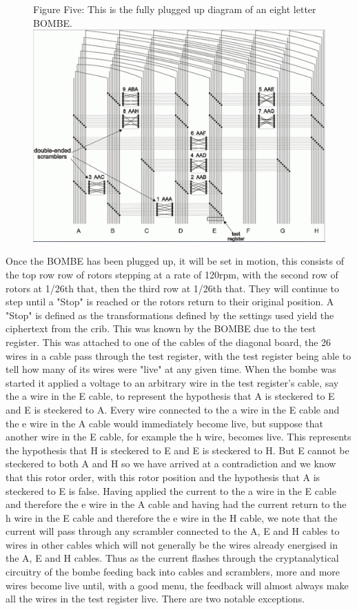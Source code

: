 \documentclass[12pt,a4paper]{article}
\begin{document}
\begin{figure}[h]
\centering
Figure Five: 
This is the fully plugged up diagram of an eight letter BOMBE.
\includegraphics[width=\textwidth]{BOMBEthree.png}
\end{figure}

Once the BOMBE has been plugged up, it will be set in motion, this consists of the top row row of rotors stepping at a rate of 120rpm, with the second row of rotors at 1/26th that, then the third row at 1/26th that. They will continue to step until a "Stop" is reached or the rotors return to their original position. A "Stop" is defined as the transformations defined by the settings used yield the ciphertext from the crib. This was known by the BOMBE due to the test register. This was attached to one of the cables of the diagonal board, the 26 wires in a cable pass through the test register, with the test register being able to tell how many of its wires were "live" at any given time. When the bombe was started it applied a voltage to an arbitrary wire in the test register's cable, say the a wire in the E cable, to represent the hypothesis that A is steckered to E and E is steckered to A. Every wire connected to the a wire in the E cable and the e wire in the A cable would immediately become live, but suppose that another wire in the E cable, for example the h wire, becomes live. This represents the hypothesis that H is steckered to E and E is steckered to H. But E cannot be steckered to both A and H so we have arrived at a contradiction and we know that this rotor order, with this rotor position and the hypothesis that A is steckered to E is false. Having applied the current to the a wire in the E cable and therefore the e wire in the A cable and having had the current return to the h wire in the E cable and therefore the e wire in the H cable, we note that the current will pass through any scrambler connected to the A, E and H cables to wires in other cables which will not generally be the wires already energised in the A, E and H cables. Thus as the current flashes through the cryptanalytical circuitry of the bombe feeding back into cables and scramblers, more and more wires become live until, with a good menu, the feedback will almost always make all the wires in the test register live. There are two notable exceptions.
\end{document}
